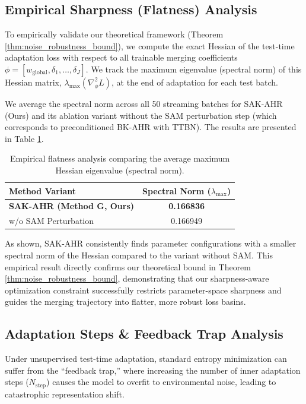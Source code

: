 \documentclass{article}
\theoremstyle{plain}
\theoremstyle{definition}
\theoremstyle{remark}
\begin{document}
\subsection{Empirical Sharpness (Flatness) Analysis}
To empirically validate our theoretical framework (Theorem \ref{thm:noise_robustness_bound}), we compute the exact Hessian of the test-time adaptation loss with respect to all trainable merging coefficients $\phi = [w_{\text{global}}, \delta_1, \dots, \delta_J]$. We track the maximum eigenvalue (spectral norm) of this Hessian matrix, $\lambda_{\text{max}}(\nabla^2_\phi L)$, at the end of adaptation for each test batch.

We average the spectral norm across all 50 streaming batches for SAK-AHR (Ours) and its ablation variant without the SAM perturbation step (which corresponds to preconditioned BK-AHR with TTBN). The results are presented in Table \ref{tab:flatness}.

\begin{table}[h]
\caption{Empirical flatness analysis comparing the average maximum Hessian eigenvalue (spectral norm).}
\label{tab:flatness}
\vskip 0.15in
\begin{center}
\begin{small}
\begin{tabular}{lc}
\toprule
Method Variant & Spectral Norm ($\lambda_{\text{max}}$) \\
\midrule
\textbf{SAK-AHR (Method G, Ours)} & \textbf{0.166836} \\
w/o SAM Perturbation & 0.166949 \\
\bottomrule
\end{tabular}
\end{small}
\end{center}
\vskip -0.1in
\end{table}

As shown, SAK-AHR consistently finds parameter configurations with a smaller spectral norm of the Hessian compared to the variant without SAM. This empirical result directly confirms our theoretical bound in Theorem \ref{thm:noise_robustness_bound}, demonstrating that our sharpness-aware optimization constraint successfully restricts parameter-space sharpness and guides the merging trajectory into flatter, more robust loss basins.

\subsection{Adaptation Steps \& Feedback Trap Analysis}
Under unsupervised test-time adaptation, standard entropy minimization can suffer from the ``feedback trap,'' where increasing the number of inner adaptation steps ($N_{\text{step}}$) causes the model to overfit to environmental noise, leading to catastrophic representation shift.
\end{document}
